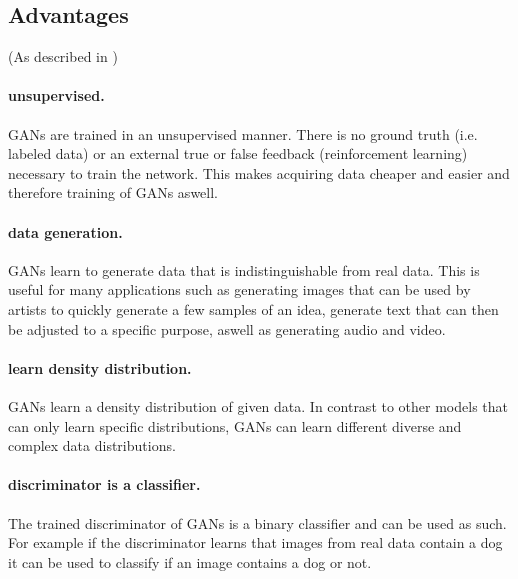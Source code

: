 \newpage

\subsection{Advantages} (As described in \cite{GAN_Projects})
\paragraph{unsupervised.} GANs are trained in an unsupervised manner. There is no ground truth (i.e. labeled data) or an external true or false feedback (reinforcement learning) necessary to train the network. This makes acquiring data cheaper and easier and therefore training of GANs aswell. 

\paragraph{data generation.} GANs learn to generate data that is indistinguishable from real data. This is useful for many applications such as generating images that can be used by artists to quickly generate a few samples of an idea, generate text that can then be adjusted to a specific purpose, aswell as generating audio and video.

\paragraph{learn density distribution.} GANs learn a density distribution of given data. In contrast to other models that can only learn specific distributions, GANs can learn different diverse and complex data distributions.

\paragraph{discriminator is a classifier.} The trained discriminator of GANs is a binary classifier and can be used as such. For example if the discriminator learns that images from real data contain a dog it can be used to classify if an image contains a dog or not. 